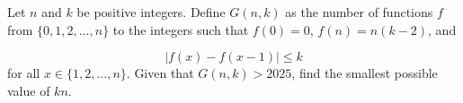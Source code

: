 Let $n$ and $k$ be positive integers. Define $G(n,k)$ as the number of functions $f$ from $\{0,1,2,\dots,n\}$ to the integers such that $f(0)=0$, $f(n)=n(k-2)$, and

$$|f(x)-f(x-1)|\leq k$$for all $x\in\{1,2,\dots,n\}$. Given that $G(n,k)>2025$, find the smallest possible value of $kn$.

